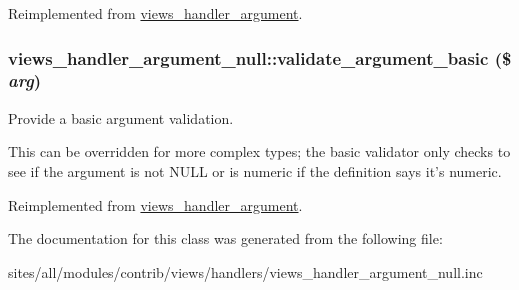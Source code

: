 Reimplemented from \hyperlink{classviews__handler__argument_c4b0ce6704a10f515b2aea2f9e790994}{views\_\-handler\_\-argument}.\hypertarget{classviews__handler__argument__null_fc4fd62d96247a2ebebbd7e44f0742ce}{
\subsubsection[{validate\_\-argument\_\-basic}]{\setlength{\rightskip}{0pt plus 5cm}views\_\-handler\_\-argument\_\-null::validate\_\-argument\_\-basic (\$ {\em arg})}}
\label{classviews__handler__argument__null_fc4fd62d96247a2ebebbd7e44f0742ce}


Provide a basic argument validation.

This can be overridden for more complex types; the basic validator only checks to see if the argument is not NULL or is numeric if the definition says it's numeric. 

Reimplemented from \hyperlink{classviews__handler__argument_b2ca8b443e4b53e1ca532faf0f4565f5}{views\_\-handler\_\-argument}.

The documentation for this class was generated from the following file:\begin{CompactItemize}
\item 
sites/all/modules/contrib/views/handlers/views\_\-handler\_\-argument\_\-null.inc\end{CompactItemize}
